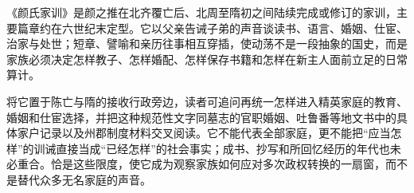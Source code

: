\begin{sourcenote}
《颜氏家训》是颜之推在北齐覆亡后、北周至隋初之间陆续完成或修订的家训，主要篇章约在六世纪末定型。它以父亲告诫子弟的声音谈读书、语言、婚姻、仕宦、治家与处世；短章、譬喻和亲历往事相互穿插，使动荡不是一段抽象的国史，而是家族必须决定怎样教子、怎样婚配、怎样保存书籍和怎样在新主人面前立足的日常算计。

将它置于陈亡与隋的接收行政旁边，读者可追问再统一怎样进入精英家庭的教育、婚姻和仕宦选择，并把这种规范性文字同墓志的官职婚姻、吐鲁番等地文书中的具体家户记录以及州郡制度材料交叉阅读。它不能代表全部家庭，更不能把“应当怎样”的训诫直接当成“已经怎样”的社会事实；成书、抄写和所回忆经历的年代也未必重合。恰是这些限度，使它成为观察家族如何应对多次政权转换的一扇窗，而不是替代众多无名家庭的声音。
\end{sourcenote}
